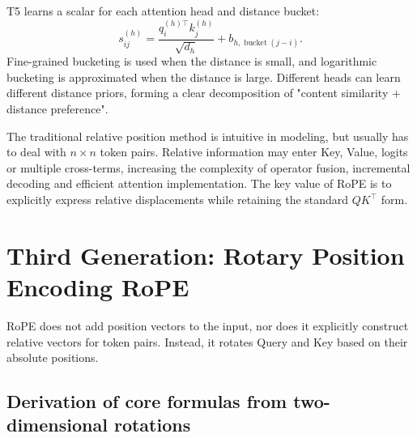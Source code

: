 \documentclass[UTF8,fontset=none,a4paper,10pt]{ctexart}
\begin{document}
T5 learns a scalar \cite{raffel2020} for each attention head and distance bucket:
\begin{equation}
  s_{ij}^{(h)}=
  \frac{q_i^{(h)\top}k_j^{(h)}}{\sqrt{d_h}}
  +b_{h,\operatorname{bucket}(j-i)}.
  \label{eq:t5-bias}
\end{equation}
Fine-grained bucketing is used when the distance is small, and logarithmic bucketing is approximated when the distance is large. Different heads can learn different distance priors, forming a clear decomposition of "content similarity $+$ distance preference".

The traditional relative position method is intuitive in modeling, but usually has to deal with $n\times n$ token pairs. Relative information may enter Key, Value, logits or multiple cross-terms, increasing the complexity of operator fusion, incremental decoding and efficient attention implementation. The key value of RoPE is to explicitly express relative displacements while retaining the standard $QK^\top$ form.

\section{Third Generation: Rotary Position Encoding RoPE}

RoPE does not add position vectors to the input, nor does it explicitly construct relative vectors for token pairs. Instead, it rotates Query and Key\cite{su2021} based on their absolute positions.

\subsection{Derivation of core formulas from two-dimensional rotations}
\end{document}
